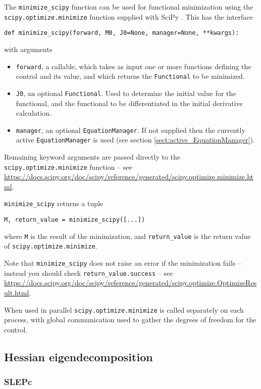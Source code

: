 \documentclass[11pt]{article}
\begin{document}
The \texttt{minimize\_scipy} function can be used for functional minimization
using the \texttt{scipy.optimize.minimize} function supplied with SciPy
\citep{scipy}. This has the interface
\begin{lstlisting}
def minimize_scipy(forward, M0, J0=None, manager=None, **kwargs):
\end{lstlisting}
with arguments
\begin{itemize}
  \item \texttt{forward}, a callable, which takes as input one or more
    functions defining the control and its value, and which returns the
    \texttt{Functional} to be minimized.
  \item \texttt{J0}, an optional \texttt{Functional}. Used to determine the
    initial value for the functional, and the functional to be differentiated
    in the initial derivative calculation.
  \item \texttt{manager}, an optional \texttt{EquationManager}. If not supplied
    then the currently active \texttt{EquationManager} is used (see section
    \ref{sect:active_EquationManager}).
\end{itemize}
Remaining keyword arguments are passed directly to the
\texttt{scipy.optimize.minimize} function -- see
\url{https://docs.scipy.org/doc/scipy/reference/generated/scipy.optimize.minimize.html}.

\texttt{minimize\_scipy} returns a tuple
\begin{lstlisting}
M, return_value = minimize_scipy([...])
\end{lstlisting}
where \texttt{M} is the result of the minimization, and \texttt{return\_value}
is the return value of \texttt{scipy.optimize.minimize}.

Note that \texttt{minimize\_scipy} does not raise an error if the minimization
fails -- instead you should check \texttt{return\_value.success} -- see
\url{https://docs.scipy.org/doc/scipy/reference/generated/scipy.optimize.OptimizeResult.html}.

When used in parallel \texttt{scipy.optimize.minimize} is called separately on
each process, with global communication used to gather the degrees of freedom
for the control.

\subsection{Hessian eigendecomposition}

\subsubsection{SLEPc}
\end{document}

